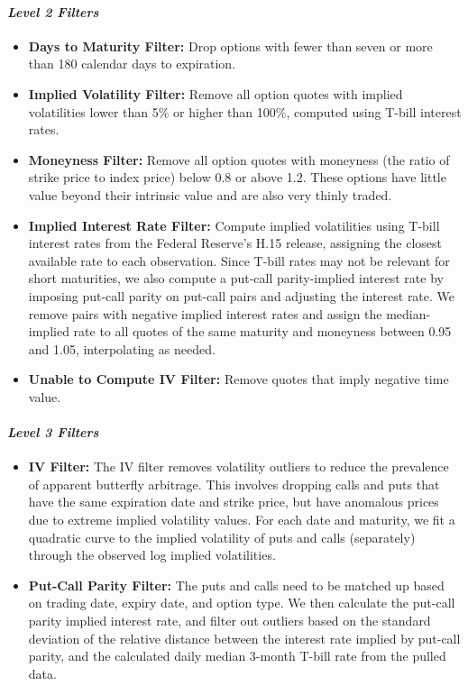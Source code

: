 \documentclass{article}
\begin{document}
\begin{appendices}
\paragraph{\textit{Level 2 Filters}}
\begin{itemize}
  \item \textbf{Days to Maturity Filter:} Drop options with fewer than seven or more than 180 calendar days to expiration.
  \item \textbf{Implied Volatility Filter:} Remove all option quotes with implied volatilities lower than 5\% or higher than 100\%, computed using T-bill interest rates.
  \item \textbf{Moneyness Filter:} Remove all option quotes with moneyness (the ratio of strike price to index price) below 0.8 or above 1.2. These options have little value beyond their intrinsic value and are also very thinly traded.
  \item \textbf{Implied Interest Rate Filter:} Compute implied volatilities using T-bill interest rates from the Federal Reserve’s H.15 release, assigning the closest available rate to each observation. Since T-bill rates may not be relevant for short maturities, we also compute a put-call parity-implied interest rate by imposing put-call parity on put-call pairs and adjusting the interest rate. We remove pairs with negative implied interest rates and assign the median-implied rate to all quotes of the same maturity and moneyness between 0.95 and 1.05, interpolating as needed.
  \item \textbf{Unable to Compute IV Filter:} Remove quotes that imply negative time value.
\end{itemize}

\paragraph{\textit{Level 3 Filters}}
\begin{itemize}
  \item \textbf{IV Filter:} The IV filter removes volatility outliers to reduce the prevalence of apparent butterfly arbitrage. This involves dropping calls and puts that have the same expiration date and strike price, but have anomalous prices due to extreme implied volatility values. For each date and maturity, we fit a quadratic curve to the implied volatility of puts and calls (separately) through the observed log implied volatilities.
  \item \textbf{Put-Call Parity Filter:} The puts and calls need to be matched up based on trading date, expiry date, and option type. We then calculate the put-call parity implied interest rate, and filter out outliers based on the standard deviation of the relative distance between the interest rate implied by put-call parity, and the calculated daily median 3-month T-bill rate from the pulled data.
\end{itemize}



\end{appendices}
\end{document}
